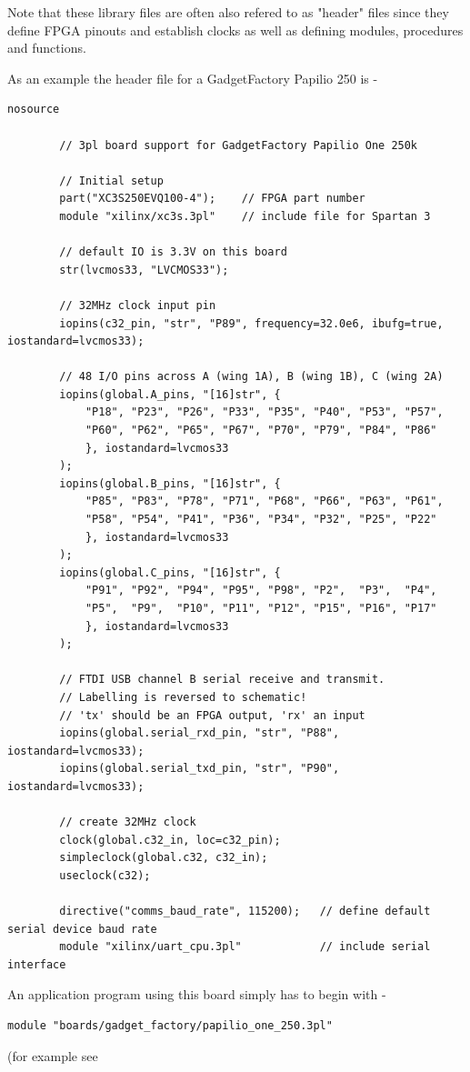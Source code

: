     Note that these library files are often also refered to as "header" files
    since they define FPGA pinouts and establish clocks as well as defining
    modules, procedures and functions.

    As an example the header file for a GadgetFactory Papilio 250 is -
    \begin{lstlisting}[gobble=8, language=threepl]
        nosource

        // 3pl board support for GadgetFactory Papilio One 250k

        // Initial setup
        part("XC3S250EVQ100-4");    // FPGA part number
        module "xilinx/xc3s.3pl"    // include file for Spartan 3

        // default IO is 3.3V on this board
        str(lvcmos33, "LVCMOS33");

        // 32MHz clock input pin
        iopins(c32_pin, "str", "P89", frequency=32.0e6, ibufg=true, iostandard=lvcmos33);

        // 48 I/O pins across A (wing 1A), B (wing 1B), C (wing 2A)
        iopins(global.A_pins, "[16]str", {
	        "P18", "P23", "P26", "P33", "P35", "P40", "P53", "P57",
	        "P60", "P62", "P65", "P67", "P70", "P79", "P84", "P86"
            }, iostandard=lvcmos33
        );
        iopins(global.B_pins, "[16]str", {
	        "P85", "P83", "P78", "P71", "P68", "P66", "P63", "P61",
	        "P58", "P54", "P41", "P36", "P34", "P32", "P25", "P22"
            }, iostandard=lvcmos33
        );
        iopins(global.C_pins, "[16]str", {
	        "P91", "P92", "P94", "P95", "P98", "P2",  "P3",  "P4",
	        "P5",  "P9",  "P10", "P11", "P12", "P15", "P16", "P17"
            }, iostandard=lvcmos33
        );

        // FTDI USB channel B serial receive and transmit.
        // Labelling is reversed to schematic!
        // 'tx' should be an FPGA output, 'rx' an input
        iopins(global.serial_rxd_pin, "str", "P88", iostandard=lvcmos33);
        iopins(global.serial_txd_pin, "str", "P90", iostandard=lvcmos33);

        // create 32MHz clock
        clock(global.c32_in, loc=c32_pin);
        simpleclock(global.c32, c32_in);
        useclock(c32);

        directive("comms_baud_rate", 115200);   // define default serial device baud rate
        module "xilinx/uart_cpu.3pl"            // include serial interface
    \end{lstlisting}

    An application program using this board simply has to begin with -
    \begin{lstlisting}[gobble=8, language=threepl]
        module "boards/gadget_factory/papilio_one_250.3pl"
    \end{lstlisting}
    (for example see 

